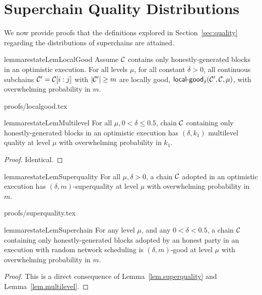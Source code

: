 \section{Superchain Quality Distributions}
\label{sec:app-quality}

We now provide proofs that the definitions explored in Section~\ref{sec:quality}
regarding the distributions of superchains are attained.

\begin{restatable}{lemma}{restateLemLocalGood}
\label{lem.localgood}
Assume $\mathcal{C}$ contains only honestly-generated blocks in an optimistic
execution. For all levels $\mu$, for all constant $\delta > 0$, all continuous
subchains $\mathcal{C}' = \mathcal{C}[i:j]$ with $|\mathcal{C}'| \geq m$ are locally good,
$\textsf{local-good}_{\delta}(\mathcal{C}', \mathcal{C}, \mu)$, with overwhelming
probability in $m$.
\end{restatable}
{proofs/localgood.tex}

\begin{restatable}{lemma}{restateLemMultilevel}
\label{lem.multilevel}
For all $\mu, 0 < \delta \leq 0.5$, chain $\mathcal{C}$ containing only
honestly-generated blocks in an optimistic execution has $(\delta, k_1)$
multilevel quality at level $\mu$ with overwhelming probability in $k_1$.
\end{restatable}
\begin{proof}
Identical.
\Qed
\end{proof}

\begin{restatable}[Superquality]{lemma}{restateLemSuperquality}
\label{lem.superquality}
For all $\mu, \delta > 0$, a chain $\mathcal{C}$ adopted in an optimistic execution
has $(\delta, m)$-superquality at level $\mu$ with overwhelming probability in
$m$.
\end{restatable}
{proofs/superquality.tex}

\begin{restatable}{lemma}{restateLemSuperchain}
\label{lem.superchain-distribution}
For any level $\mu$, and any $0 < \delta < 0.5$, a chain
$\mathcal{C}$ containing only honestly-generated blocks adopted by an honest party in
an execution with random network scheduling is $(\delta, m)$-good at level
$\mu$ with overwhelming probability in $m$.
\end{restatable}
\begin{proof}
This is a direct consequence of Lemma~\ref{lem.superquality} and
Lemma~\ref{lem.multilevel}. \Qed
\end{proof}
